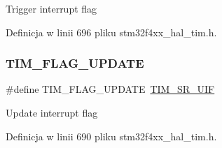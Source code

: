 Trigger interrupt flag 

Definicja w linii 696 pliku stm32f4xx\+\_\+hal\+\_\+tim.\+h.

\mbox{\label{group___t_i_m___flag__definition_gac45ce66cf33b4f324323fc3036917712}} 
\subsubsection{\texorpdfstring{T\+I\+M\+\_\+\+F\+L\+A\+G\+\_\+\+U\+P\+D\+A\+TE}{TIM\_FLAG\_UPDATE}}
{\footnotesize\ttfamily \#define T\+I\+M\+\_\+\+F\+L\+A\+G\+\_\+\+U\+P\+D\+A\+TE~\hyperlink{group___peripheral___registers___bits___definition_gac8c03fabc10654d2a3f76ea40fcdbde6}{T\+I\+M\+\_\+\+S\+R\+\_\+\+U\+IF}}

Update interrupt flag 

Definicja w linii 690 pliku stm32f4xx\+\_\+hal\+\_\+tim.\+h.

